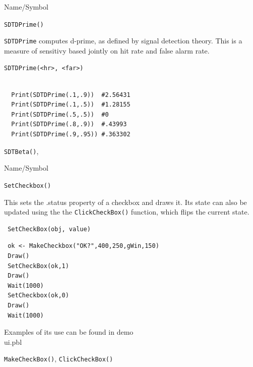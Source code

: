 \begin{desc}{Name/Symbol}
\item[Name/Symbol] 	\verb+SDTDPrime()+

\item[Description] \verb+SDTDPrime+ computes d-prime, as defined by
signal detection theory.  This is a measure of sensitivy based jointly
on hit rate and false alarm rate.

\item[Usage]        	
\begin{verbatim}
SDTDPrime(<hr>, <far>)
\end{verbatim}

\item[Example] 	
\begin{verbatim}

  Print(SDTDPrime(.1,.9))  #2.56431
  Print(SDTDPrime(.1,.5))  #1.28155
  Print(SDTDPrime(.5,.5))  #0
  Print(SDTDPrime(.8,.9))  #.43993
  Print(SDTDPrime(.9,.95)) #.363302

\end{verbatim}

\item[See Also]\verb+SDTBeta()+,
\end{desc}


\begin{desc}{Name/Symbol}
\item[Name/Symbol]  	\verb+SetCheckbox()+

\item[Description]	
This sets the .status property of a checkbox and draws it.   Its state can also be updated using the the \texttt{ClickCheckBox()} function, which flips the current state. 

\item[Usage]
\begin{verbatim}
 SetCheckBox(obj, value)
  \end{verbatim}

\item[Example]      	


\begin{verbatim}
 ok <- MakeCheckbox("OK?",400,250,gWin,150)
 Draw()
 SetCheckBox(ok,1)
 Draw()	
 Wait(1000)
 SetCheckbox(ok,0)
 Draw()
 Wait(1000)
\end{verbatim}

Examples of its use can be found in demo\\ui.pbl
\item[See Also]	\verb+MakeCheckBox()+, \verb+ClickCheckBox()+
\end{desc}


